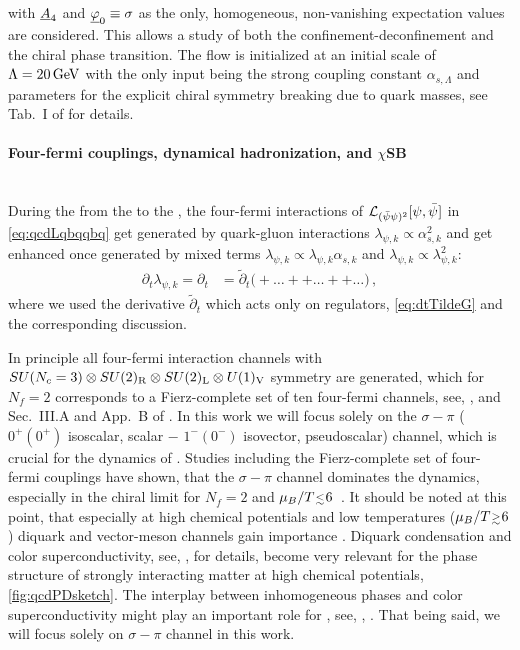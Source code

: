 with $\underline{A}_4$ and $\underline{\varphi}_0\equiv\sigma$ as the only, homogeneous, non-vanishing expectation values are considered.
This allows a study of both the confinement-deconfinement and the chiral phase transition.
The flow is initialized at an \uv{} initial scale of $\Lambda = 20\,\mathrm{GeV}$ with the only input being the strong coupling constant $\alpha_{s,\Lambda}$ and parameters for the explicit chiral symmetry breaking due to quark masses, see Tab.~I of  for details.

\paragraph{Four-fermi couplings, dynamical hadronization, and \texorpdfstring{$\chi$SB}{cSB}}\label{paragraph:qcdDynHad}\mbox{}\\%
During the \rgscaleevolution{} from the \uv{} to the \ir{}, the four-fermi interactions of $\mathcal{L}_{(\bar{\psi}\psi)^2}[\psi,\bar{\psi}\mkern0.5mu{}]$ in \cref{eq:qcdLqbqqbq} get generated by quark-gluon interactions 
$\lambda_{\psi,k}\propto\alpha_{s,k}^2$ and get enhanced once generated by mixed terms $\lambda_{\psi,k}\propto\lambda_{\psi,k}\alpha_{s,k}$ and $\lambda_{\psi,k}\propto\lambda_{\psi,k}^2$:
\begin{align}
\partial_t \lambda_{\psi,k}=
\partial_t &= \tilde{\partial}_t \Bigg(
+\ldots
++\ldots
++\ldots
\Bigg)\,,\label{eq:qcd4fermiFlow}
\end{align}
where we used the \rgtime{} derivative $\tilde{\partial}_t$ which acts only on regulators, \cf{} \cref{eq:dtTildeG} and the corresponding discussion.

In principle all four-fermi interaction channels with $SU(N_c=3)\otimes SU(2)_{\mathrm{R}}\otimes SU(2)_{\mathrm{L}}\otimes U(1)_{\mathrm{V}}$ symmetry are generated, which for $N_f=2$ corresponds to a Fierz-complete set of ten four-fermi channels, see, \eg{}, \ccite{\qIVfierz} and Sec.~III.A and App.~B of . 
In this work we will focus solely on the $\sigma-\pi$ ($0^+(0^+)$ isoscalar, scalar $-$ $1^-(0^-)$ isovector, pseudoscalar) channel, which is crucial for the dynamics of \csb{}.
Studies including the Fierz-complete set of four-fermi couplings have shown, that the $\sigma-\pi$ channel dominates the dynamics, especially in the chiral limit for $N_f=2$ and 
$\mu_B/T\smallerlesssim 6$~\cite{Braun:2019aow,Fu:2019hdw,Fu:2022uow}.
It should be noted at this point, that especially at high chemical potentials and low temperatures ($\mu_B/T\smallergtrsim 6$) diquark and vector-meson channels gain importance
\cite{Braun:2017srn,Braun:2018bik,Braun:2019aow,Fu:2019hdw,Fu:2022uow}.
Diquark condensation and color superconductivity, see, \eg{},  for details, become very relevant for the phase structure of strongly interacting matter at high chemical potentials, \cf{} \cref{fig:qcdPDsketch}.
The interplay between inhomogeneous phases and color superconductivity might play an important role for \csb{}, see, \eg{}, \ccite{\inhomoCSC}.
That being said, we will focus solely on $\sigma-\pi$ channel in this work.

